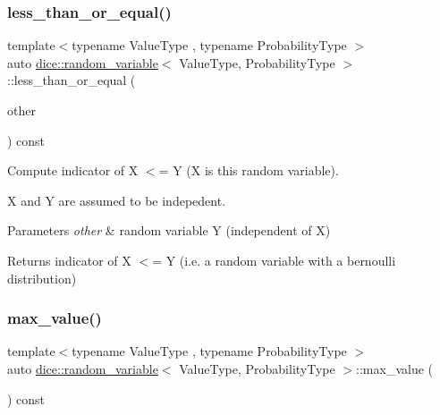 \subsubsection{\texorpdfstring{less\+\_\+than\+\_\+or\+\_\+equal()}{less\_than\_or\_equal()}}
{\footnotesize\ttfamily template$<$typename Value\+Type , typename Probability\+Type $>$ \\
auto \mbox{\hyperlink{classdice_1_1random__variable}{dice\+::random\+\_\+variable}}$<$ Value\+Type, Probability\+Type $>$\+::less\+\_\+than\+\_\+or\+\_\+equal (\begin{DoxyParamCaption}\item[{const \mbox{\hyperlink{classdice_1_1random__variable}{random\+\_\+variable}}$<$ Value\+Type, Probability\+Type $>$ \&}]{other }\end{DoxyParamCaption}) const\hspace{0.3cm}{\ttfamily [inline]}}



Compute indicator of X $<$= Y (X is this random variable). 

X and Y are assumed to be indepedent.


\begin{DoxyParams}{Parameters}
{\em other} & random variable Y (independent of X)\\
\hline
\end{DoxyParams}
\begin{DoxyReturn}{Returns}
indicator of X $<$= Y (i.\+e. a random variable with a bernoulli distribution) 
\end{DoxyReturn}
\mbox{\label{classdice_1_1random__variable_a1cf78d3c3fa4b13d85215b873a50be5f}} 
\subsubsection{\texorpdfstring{max\+\_\+value()}{max\_value()}}
{\footnotesize\ttfamily template$<$typename Value\+Type , typename Probability\+Type $>$ \\
auto \mbox{\hyperlink{classdice_1_1random__variable}{dice\+::random\+\_\+variable}}$<$ Value\+Type, Probability\+Type $>$\+::max\+\_\+value (\begin{DoxyParamCaption}{ }\end{DoxyParamCaption}) const\hspace{0.3cm}{\ttfamily [inline]}}



